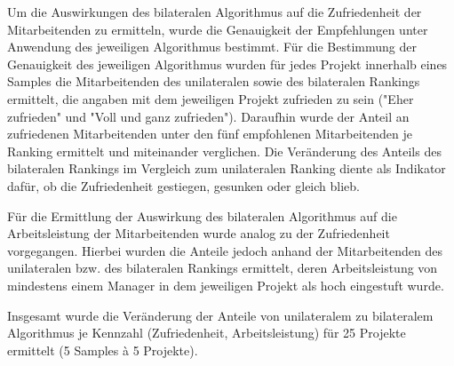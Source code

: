 Um die Auswirkungen des bilateralen Algorithmus auf die Zufriedenheit der Mitarbeitenden zu ermitteln, wurde die Genauigkeit der Empfehlungen unter Anwendung des jeweiligen Algorithmus bestimmt.
Für die Bestimmung der Genauigkeit des jeweiligen Algorithmus wurden für jedes Projekt innerhalb eines Samples die Mitarbeitenden des unilateralen sowie des bilateralen Rankings ermittelt, die angaben mit dem jeweiligen Projekt zufrieden zu sein ("Eher zufrieden" und "Voll und ganz zufrieden").
Daraufhin wurde der Anteil an zufriedenen Mitarbeitenden unter den fünf empfohlenen Mitarbeitenden je Ranking ermittelt und miteinander verglichen.
Die Veränderung des Anteils des bilateralen Rankings im Vergleich zum unilateralen Ranking diente als Indikator dafür, ob die Zufriedenheit gestiegen, gesunken oder gleich blieb.

Für die Ermittlung der Auswirkung des bilateralen Algorithmus auf die Arbeitsleistung der Mitarbeitenden wurde analog zu der Zufriedenheit vorgegangen.
Hierbei wurden die Anteile jedoch anhand der Mitarbeitenden des unilateralen bzw. des bilateralen Rankings ermittelt, deren Arbeitsleistung von mindestens einem Manager in dem jeweiligen Projekt als hoch eingestuft wurde.

Insgesamt wurde die Veränderung der Anteile von unilateralem zu bilateralem Algorithmus je Kennzahl (Zufriedenheit, Arbeitsleistung) für 25 Projekte ermittelt (5 Samples \`{a} 5 Projekte).


